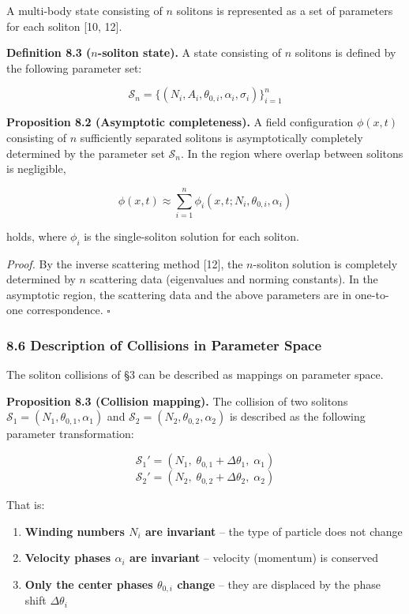 \documentclass[a4paper,11pt]{article}
\providecommand{\tightlist}{\setlength{\itemsep}{0pt}\setlength{\parskip}{0pt}}
\begin{document}
A multi-body state consisting of \(n\) solitons is represented as a set
of parameters for each soliton {[}10, 12{]}.

\textbf{Definition 8.3 (\(n\)-soliton state).} A state consisting of
\(n\) solitons is defined by the following parameter set:

\[\mathcal{S}_n = \{(N_i, A_i, \theta_{0,i}, \alpha_i, \sigma_i)\}_{i=1}^{n}\]

\textbf{Proposition 8.2 (Asymptotic completeness).} A field
configuration \(\phi(x, t)\) consisting of \(n\) sufficiently separated
solitons is asymptotically completely determined by the parameter set
\(\mathcal{S}_n\). In the region where overlap between solitons is
negligible,

\[\phi(x, t) \approx \sum_{i=1}^{n} \phi_i(x, t; N_i, \theta_{0,i}, \alpha_i)\]

holds, where \(\phi_i\) is the single-soliton solution for each soliton.

\emph{Proof.} By the inverse scattering method {[}12{]}, the
\(n\)-soliton solution is completely determined by \(n\) scattering data
(eigenvalues and norming constants). In the asymptotic region, the
scattering data and the above parameters are in one-to-one
correspondence. \(\square\)

\subsubsection{8.6 Description of Collisions in Parameter
Space}\label{description-of-collisions-in-parameter-space}

The soliton collisions of §3 can be described as mappings on parameter
space.

\textbf{Proposition 8.3 (Collision mapping).} The collision of two
solitons \(\mathcal{S}_1 = (N_1, \theta_{0,1}, \alpha_1)\) and
\(\mathcal{S}_2 = (N_2, \theta_{0,2}, \alpha_2)\) is described as the
following parameter transformation:

\[\mathcal{S}_1' = (N_1,\; \theta_{0,1} + \Delta\theta_1,\; \alpha_1)\]
\[\mathcal{S}_2' = (N_2,\; \theta_{0,2} + \Delta\theta_2,\; \alpha_2)\]

That is:

\begin{enumerate}
\def\labelenumi{\arabic{enumi}.}
\tightlist
\item
  \textbf{Winding numbers \(N_i\) are invariant} -- the type of particle
  does not change
\item
  \textbf{Velocity phases \(\alpha_i\) are invariant} -- velocity
  (momentum) is conserved
\item
  \textbf{Only the center phases \(\theta_{0,i}\) change} -- they are
  displaced by the phase shift \(\Delta\theta_i\)
\end{enumerate}
\end{document}
